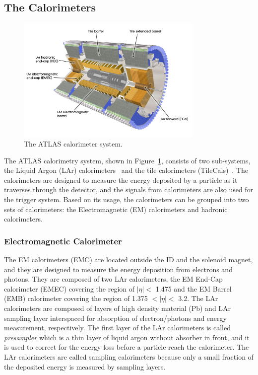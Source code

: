 \subsection{The Calorimeters}
\label{sec:atlas:calorimeter}

\begin{figure}[!htb]
    \includegraphics[width=0.8\textwidth]{figures/calorimeter.jpg}
    \centering
    \caption{The ATLAS calorimeter system.}
    \label{fig:calorimeter}
\end{figure}


The ATLAS calorimetry system, shown in Figure~\ref{fig:calorimeter}, consists of two sub-systems, the Liquid Argon (LAr) calorimeters~\cite{1742-6596-293-1-012044} and the tile calorimeters (TileCals)~\cite{HenriquesCorreia:2004868}. The calorimeters are designed to measure the energy deposited by a particle as it traverses through the detector, and the signals from calorimeters are also used for the trigger system. Based on its usage, the calorimeters can be grouped into two sets of calorimeters: the Electromagnetic (EM) calorimeters and hadronic calorimeters.


\subsubsection{Electromagnetic Calorimeter}
\label{sec:atlas:EMcal}
The EM calorimeters (EMC) are located outside the ID and the solenoid magnet, and they are designed to measure the energy deposition from electrons and photons. They are composed of two LAr calorimeters, the EM End-Cap calorimeter (EMEC) covering the region of $|\eta|<$ 1.475 and the EM Barrel (EMB) calorimeter covering the region of 1.375 $<|\eta|<$ 3.2. The LAr calorimeters are composed of layers of high density material (Pb) and LAr sampling layer interspaced for absorption of electron/photons and energy measurement, respectively. The first layer of the LAr calorimeters is called \textit{presampler} which is a thin layer of liquid argon without absorber in front, and it is used to correct for the energy loss before a particle reach the calorimeter. The LAr calorimeters are called sampling calorimeters because only a small fraction of the deposited energy is measured by sampling layers.

